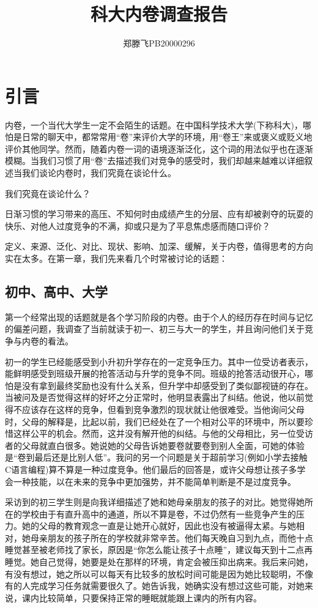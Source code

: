 \documentclass[UTF8,a4paper,fontset=windows,11pt,openany]{ctexbook}
\title{\Huge\heiti 科大内卷调查报告}
\author{\Large 郑滕飞PB20000296}
\date{}
\begin{document}
\maketitle
\tableofcontents

\chapter{引言}
内卷，一个当代大学生一定不会陌生的话题。在中国科学技术大学(下称科大)，哪怕是日常的聊天中，都常常用“卷”来评价大学的环境，用“卷王”来或褒义或贬义地评价其他同学。然而，随着内卷一词的语境逐渐泛化，这个词的用法似乎也在逐渐模糊。当我们习惯了用“卷”去描述我们对竞争的感受时，我们却越来越难以详细叙述当我们谈论内卷时，我们究竟在谈论什么。

我们究竟在谈论什么？

日渐习惯的学习带来的高压、不知何时由成绩产生的分层、应有却被剥夺的玩耍的快乐、对他人过度竞争的不满，抑或只是为了平息焦虑感而随口评价？

定义、来源、泛化、对比、现状、影响、加深、缓解，关于内卷，值得思考的方向实在太多。在第一章，我们先来看几个时常被讨论的话题：

\section{初中、高中、大学}
第一个经常出现的话题就是各个学习阶段的内卷。由于个人的经历存在时间与记忆的偏差问题，我调查了当前就读于初一、初三与大一的学生，并且询问他们关于竞争与内卷的看法。

初一的学生已经能感受到小升初升学存在的一定竞争压力。其中一位受访者表示，能鲜明感受到班级开展的抢答活动与升学的竞争不同。班级的抢答活动很开心，哪怕是没有拿到最终奖励也没有什么关系，但升学中却感受到了类似鄙视链的存在。当被问及是否觉得这样的好坏之分正常时，他明显表露出了纠结。他说，他以前觉得不应该存在这样的竞争，但看到竞争激烈的现状就让他很难受。当他询问父母时，父母的解释是，比起以前，我们已经处在了一个相对公平的环境中，所以要珍惜这样公平的机会。然而，这并没有解开他的纠结。与他的父母相比，另一位受访者的父母就直白很多。她说她的父母告诉她要卷就要卷到别人全面，可她的体验是“卷到最后还是比别人低”。我问的另一个问题是关于超前学习(例如小学去接触C语言编程)算不算是一种过度竞争。他们最后的回答是，或许父母想让孩子多学会一种技能，以在未来的竞争中更加强势，并不能简单判断是不是过度竞争。

采访到的初三学生则是向我详细描述了她和她母亲朋友的孩子的对比。她觉得她所在的学校由于有直升高中的通道，所以不算是卷，不过仍然有一些竞争产生的压力。她的父母的教育观念一直是让她开心就好，因此也没有被逼得太紧。与她相对，她母亲朋友的孩子所在的学校就非常辛苦。他们每天晚自习到九点，而他十点睡觉甚至被老师找了家长，原因是“你怎么能让孩子十点睡”，建议每天到十二点再睡觉。她自己觉得，她要是处在那样的环境，肯定会被压抑出病来。我后来问她，有没有想过，她之所以可以每天有比较多的放松时间可能是因为她比较聪明，不像有的人完成学习任务就需要很久了。她告诉我，她确实没有想过这些可能，对她来说，课内比较简单，只要保持正常的睡眠就能跟上课内的所有内容。
\end{document}
